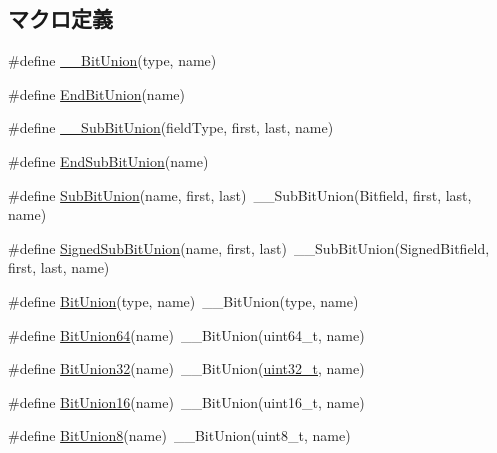 \subsection*{マクロ定義}
\begin{DoxyCompactItemize}
\item 
\#define \hyperlink{bitunion_8hh_aa13e0781c0301f0a81fe2716f8e9fcb0}{\_\-\_\-BitUnion}(type, name)
\item 
\#define \hyperlink{bitunion_8hh_a2b65fb4c081b1e4853eac07e606060e5}{EndBitUnion}(name)
\item 
\#define \hyperlink{bitunion_8hh_a3ca55f8aed22702db3a0257e5d06bbfd}{\_\-\_\-SubBitUnion}(fieldType, first, last, name)
\item 
\#define \hyperlink{bitunion_8hh_ab640680c2b6f558138bf66947382f384}{EndSubBitUnion}(name)
\item 
\#define \hyperlink{bitunion_8hh_a486b430e5e72a2b6f18cc3cffb234223}{SubBitUnion}(name, first, last)~\_\-\_\-SubBitUnion(Bitfield, first, last, name)
\item 
\#define \hyperlink{bitunion_8hh_a27508fc2ec6d3aba129bb2d8ed298abc}{SignedSubBitUnion}(name, first, last)~\_\-\_\-SubBitUnion(SignedBitfield, first, last, name)
\item 
\#define \hyperlink{bitunion_8hh_ac16e22edf440111622f35535757ded10}{BitUnion}(type, name)~\_\-\_\-BitUnion(type, name)
\item 
\#define \hyperlink{bitunion_8hh_a0f253eb4eb77a755d985e07b3dee8a03}{BitUnion64}(name)~\_\-\_\-BitUnion(uint64\_\-t, name)
\item 
\#define \hyperlink{bitunion_8hh_a0ccde5c4cc801eb6422a3b9a11d4815f}{BitUnion32}(name)~\_\-\_\-BitUnion(\hyperlink{Type_8hh_a435d1572bf3f880d55459d9805097f62}{uint32\_\-t}, name)
\item 
\#define \hyperlink{bitunion_8hh_ab20ad0bcf530a8c69acba93573493580}{BitUnion16}(name)~\_\-\_\-BitUnion(uint16\_\-t, name)
\item 
\#define \hyperlink{bitunion_8hh_a64e8480fc40a8490a0db7a656e9c3b30}{BitUnion8}(name)~\_\-\_\-BitUnion(uint8\_\-t, name)
\end{DoxyCompactItemize}


